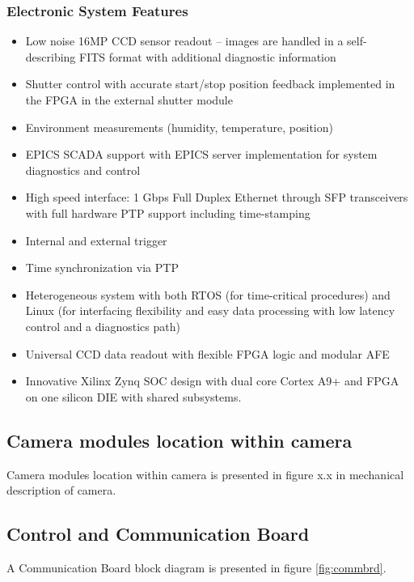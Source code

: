 \subsubsection {Electronic System Features}
\begin{itemize}
\item Low noise 16MP CCD sensor readout – images are handled in a self-describing FITS format with additional diagnostic information
\item Shutter control with accurate start/stop position feedback implemented in the FPGA in the external shutter module
\item Environment measurements (humidity, temperature, position)
\item EPICS SCADA support with EPICS server implementation for system diagnostics and control
\item High speed interface: 1 Gbps Full Duplex Ethernet through SFP transceivers with full hardware PTP support including time-stamping
\item Internal and external trigger
\item Time synchronization via PTP
\item Heterogeneous system with both RTOS (for time-critical procedures) and Linux (for interfacing flexibility and easy data processing with low latency control and a diagnostics path)
\item Universal CCD data readout with flexible FPGA logic and modular AFE
\item Innovative Xilinx Zynq SOC design with dual core Cortex A9+ and FPGA on one silicon DIE with shared subsystems.
\end{itemize}

\subsection{Camera modules location within camera}
Camera modules location within camera is presented in figure x.x in mechanical description of camera.

\subsection{Control and Communication Board}

A Communication Board block diagram is presented in figure \ref{fig:commbrd}.

